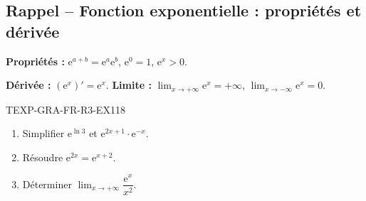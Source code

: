 

\subsection*{Rappel -- Fonction exponentielle : propriétés et dérivée}

\textbf{Propriétés :} $\mathrm{e}^{a+b} = \mathrm{e}^a \mathrm{e}^b$, $\mathrm{e}^0 = 1$, $\mathrm{e}^x > 0$.

\textbf{Dérivée :} $(\mathrm{e}^x)' = \mathrm{e}^x$. \textbf{Limite :} $\lim_{x \to +\infty} \mathrm{e}^x = +\infty$, $\lim_{x \to -\infty} \mathrm{e}^x = 0$.

\begin{exercice}{TEXP-GRA-FR-R3-EX1}{1}{8}
\begin{enumerate}
  \item Simplifier $\mathrm{e}^{\ln 3}$ et $\mathrm{e}^{2x + 1} \cdot \mathrm{e}^{-x}$.
  \item Résoudre $\mathrm{e}^{2x} = \mathrm{e}^{x+2}$.
  \item Déterminer $\lim_{x \to +\infty} \dfrac{\mathrm{e}^x}{x^2}$.
\end{enumerate}
\end{exercice}

